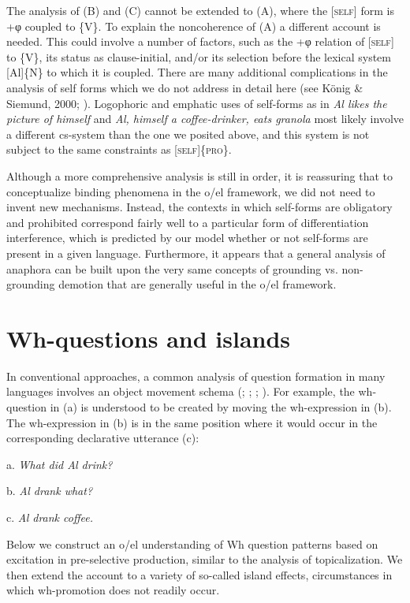   The analysis of (B) and (C) cannot be extended to (A), where the [\textsc{self}] form is +φ coupled to \{V\}. To explain the noncoherence of (A) a different account is needed. This could involve a number of factors, such as the +φ relation of [\textsc{self}] to \{V\}, its status as clause-initial, and/or its selection before the lexical system [Al]\{N\} to which it is coupled. There are many additional complications in the analysis of self forms which we do not address in detail here (see König \& Siemund, 2000; \citealt{Safir2004}). Logophoric and emphatic uses of self-forms as in \textit{Al likes the picture of himself} and \textit{Al, himself a coffee-drinker, eats granola} most likely involve a different cs-system than the one we posited above, and this system is not subject to the same constraints as [\textsc{self}]\{\textsc{pro}\}. 

  Although a more comprehensive analysis is still in order, it is reassuring that to conceptualize binding phenomena in the o/el framework, we did not need to invent new mechanisms. Instead, the contexts in which self-forms are obligatory and prohibited correspond fairly well to a particular form of differentiation interference, which is predicted by our model whether or not self-forms are present in a given language. Furthermore, it appears that a general analysis of anaphora can be built upon the very same concepts of grounding vs. non-grounding demotion that are generally useful in the o/el framework.

\section{Wh-questions and islands}

In conventional approaches, a common analysis of question formation in many languages involves an object movement schema (\citealt{Baker1970}; \citealt{Cheng1997}; \citealt{Chomsky1965}; \citealt{Karttunen1977}). For example, the wh-question in (a) is understood to be created by moving the wh-expression in (b). The wh-expression in (b) is in the same position where it would occur in the corresponding declarative utterance (c):

  a.  \textit{What did Al drink?}

  b.  \textit{Al drank what?}

  c.  \textit{Al drank coffee.}

  Below we construct an o/el understanding of Wh question patterns based on excitation in pre-selective production, similar to the analysis of topicalization. We then extend the account to a variety of so-called island effects, circumstances in which wh-promotion does not readily occur. 

